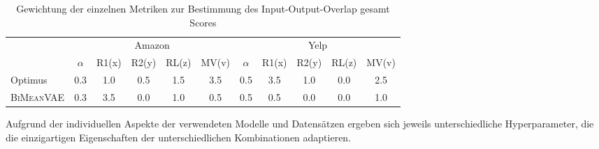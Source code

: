 \begin{table}[h!]
    \centering
    \begin{tabular}{@{}lccccc|ccccc@{}}
    \toprule
    & \multicolumn{5}{c}{Amazon} & \multicolumn{5}{c}{Yelp} \\ 
    
             &$\alpha$ & R1(x)  & R2(y)  & RL(z) & MV(v)&$\alpha$ &  R1(x)  & R2(y)  & RL(z) & MV(v) \\ \midrule

    Optimus            & 0.3 & 1.0 & 0.5 & 1.5 & 3.5 & 0.5 & 3.5 & 1.0 & 0.0 & 2.5 \\
    \textsc{BiMeanVAE} & 0.3 & 3.5 & 0.0 & 1.0 & 0.5 & 0.5 & 0.5 & 0.0 & 0.0 & 1.0 \\ \bottomrule
    \end{tabular}
    \caption{Gewichtung der einzelnen Metriken zur Bestimmung des Input-Output-Overlap gesamt Scores}
    \label{weight_mv}
\end{table}

Aufgrund der individuellen Aspekte der verwendeten Modelle und Datensätzen ergeben sich jeweils unterschiedliche Hyperparameter, die die einzigartigen Eigenschaften der unterschiedlichen Kombinationen adaptieren.

\pagebreak


    
    

